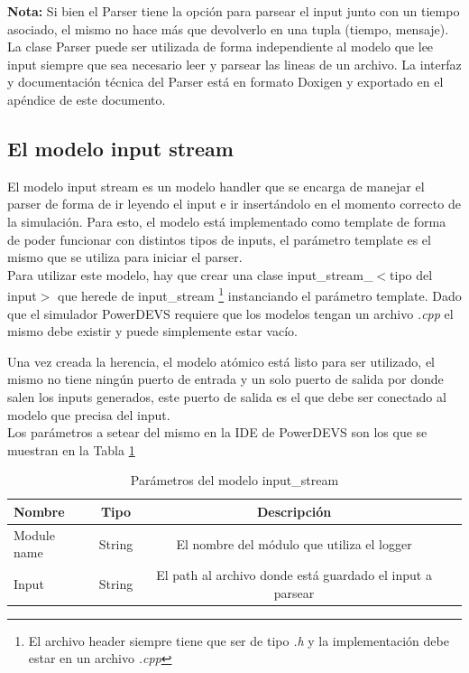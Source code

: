 \documentclass[10pt,a4paper]{article}
\begin{document}
\textbf{Nota:} Si bien el Parser tiene la opción para parsear el input junto con un tiempo asociado, el mismo no hace más que devolverlo en una tupla (tiempo, mensaje).\\

La clase Parser puede ser utilizada de forma independiente al modelo que lee input siempre que sea necesario leer y parsear las lineas de un archivo. La interfaz y documentación técnica del Parser está en formato Doxigen y exportado en el apéndice de este documento.

\subsection{El modelo input stream}

El modelo input stream es un modelo handler que se encarga de manejar el parser de forma de ir leyendo el input e ir insertándolo en el momento correcto de la simulación. Para esto, el modelo está implementado como template de forma de poder funcionar con distintos tipos de inputs, el parámetro template es el mismo que se utiliza para iniciar el parser. \\

Para utilizar este modelo, hay que crear una clase input\_stream\_$<$tipo del input$>$ que herede de input\_stream \footnote{El archivo header siempre tiene que ser de tipo \textit{.h} y la implementación debe estar en un archivo \textit{.cpp}} instanciando el parámetro template. Dado que el simulador PowerDEVS requiere que los modelos tengan un archivo \textit{.cpp} el mismo debe existir y puede simplemente estar vacío.

Una vez creada la herencia, el modelo atómico está listo para ser utilizado, el mismo no tiene ningún puerto de entrada y un solo puerto de salida por donde salen los inputs generados, este puerto de salida es el que debe ser conectado al modelo que precisa del input. \\

Los parámetros a setear del mismo en la IDE de PowerDEVS son los que se muestran en la Tabla \ref{table: input stream parameters}
\begin{table}[h]
\begin{tabular}{|l|c|c|c|}
  \hline
  \textbf{Nombre} & \textbf{Tipo} & \textbf{Descripción} \\
  \hline
  Module name & String & El nombre del módulo que utiliza el logger \\
  \hline
  Input & String & El path al archivo donde está guardado el input a parsear \\
  \hline
\end{tabular}
\caption{Parámetros del modelo input\_stream}
\label{table: input stream parameters}
\end{table}
\end{document}
